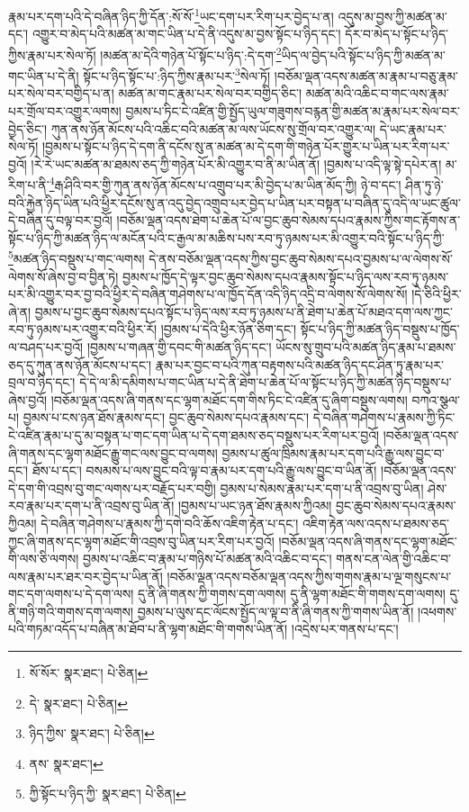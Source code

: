 རྣམ་པར་དག་པའི་དེ་བཞིན་ཉིད་ཀྱི་དོན་:སོ་སོ་\footnote{སོ་སོར་  སྣར་ཐང་།  པེ་ཅིན། }ཡང་དག་པར་རིག་པར་བྱེད་པ་ན། འདུས་མ་བྱས་ཀྱི་མཚན་མ་དང་། འགྱུར་བ་མེད་པའི་མཚན་མ་གང་ཡིན་པ་དེ་ནི་འདུས་མ་བྱས་སྟོང་པ་ཉིད་དང་། དོར་བ་མེད་པ་སྟོང་པ་ཉིད་ཀྱིས་རྣམ་པར་སེལ་ཏོ། །མཚན་མ་དེའི་གཉེན་པོ་སྟོང་པ་ཉིད་:དེ་དག་\footnote{དེ་  སྣར་ཐང་།  པེ་ཅིན། }ཡིད་ལ་བྱེད་པའི་སྟོང་པ་ཉིད་ཀྱི་མཚན་མ་གང་ཡིན་པ་དེ་ནི། སྟོང་པ་ཉིད་སྟོང་པ་:ཉིད་ཀྱིས་རྣམ་པར་\footnote{ཉིད་ཀྱིས་  སྣར་ཐང་།  པེ་ཅིན། }སེལ་ཏོ། །བཅོམ་ལྡན་འདས་མཚན་མ་རྣམ་པ་བཅུ་རྣམ་པར་སེལ་བར་བགྱིད་པ་ན། མཚན་མ་གང་རྣམ་པར་སེལ་བར་བགྱིད་ཅིང་། མཚན་མའི་འཆིང་བ་གང་ལས་རྣམ་པར་གྲོལ་བར་འགྱུར་ལགས། བྱམས་པ་ཏིང་ངེ་འཛིན་གྱི་སྤྱོད་ཡུལ་གཟུགས་བརྙན་གྱི་མཚན་མ་རྣམ་པར་སེལ་བར་བྱེད་ཅིང་། ཀུན་ནས་ཉོན་མོངས་པའི་འཆིང་བའི་མཚན་མ་ལས་ཡོངས་སུ་གྲོལ་བར་འགྱུར་ལ། དེ་ཡང་རྣམ་པར་སེལ་ཏོ། །བྱམས་པ་སྟོང་པ་ཉིད་དེ་དག་ནི་དངོས་སུ་ན་མཚན་མ་དེ་དག་གི་གཉེན་པོར་གྱུར་པ་ཡིན་པར་རིག་པར་བྱའོ། །རེ་རེ་ཡང་མཚན་མ་ཐམས་ཅད་ཀྱི་གཉེན་པོར་མི་འགྱུར་བ་ནི་མ་ཡིན་ནོ། །བྱམས་པ་འདི་ལྟ་སྟེ་དཔེར་ན། མ་རིག་པ་ནི་\footnote{ནས་  སྣར་ཐང་། }རྒ་ཤིའི་བར་གྱི་ཀུན་ནས་ཉོན་མོངས་པ་འགྲུབ་པར་མི་བྱེད་པ་མ་ཡིན་མོད་ཀྱི། ཉེ་བ་དང་། ཤིན་ཏུ་ཉེ་བའི་རྐྱེན་ཉིད་ཡིན་པའི་ཕྱིར་དངོས་སུ་ན་འདུ་བྱེད་འགྲུབ་པར་བྱེད་པ་ཡིན་པར་བསྟན་པ་བཞིན་དུ་འདི་ལ་ཡང་ཚུལ་དེ་བཞིན་དུ་བལྟ་བར་བྱའོ། །བཅོམ་ལྡན་འདས་ཐེག་པ་ཆེན་པོ་ལ་བྱང་ཆུབ་སེམས་དཔའ་རྣམས་ཀྱིས་གང་རྟོགས་ན་སྟོང་པ་ཉིད་ཀྱི་མཚན་ཉིད་ལ་མངོན་པའི་ང་རྒྱལ་མ་མཆིས་པས་རབ་ཏུ་ཉམས་པར་མི་འགྱུར་བའི་སྟོང་པ་ཉིད་ཀྱི་\footnote{ཀྱི་སྟོང་པ་ཉིད་ཀྱི་  སྣར་ཐང་།  པེ་ཅིན། }མཚན་ཉིད་བསྡུས་པ་གང་ལགས། དེ་ནས་བཅོམ་ལྡན་འདས་ཀྱིས་བྱང་ཆུབ་སེམས་དཔའ་བྱམས་པ་ལ་ལེགས་སོ་ལེགས་སོ་ཞེས་བྱ་བ་བྱིན་ཏེ། བྱམས་པ་ཁྱོད་དེ་ལྟར་བྱང་ཆུབ་སེམས་དཔའ་རྣམས་སྟོང་པ་ཉིད་ལས་རབ་ཏུ་ཉམས་པར་མི་འགྱུར་བར་བྱ་བའི་ཕྱིར་དེ་བཞིན་གཤེགས་པ་ལ་ཁྱོད་དོན་འདི་ཉིད་འདྲི་བ་ལེགས་སོ་ལེགས་སོ། །དེ་ཅིའི་ཕྱིར་ཞེ་ན། བྱམས་པ་བྱང་ཆུབ་སེམས་དཔའ་སྟོང་པ་ཉིད་ལས་རབ་ཏུ་ཉམས་པ་ནི་ཐེག་པ་ཆེན་པོ་མཐའ་དག་ལས་ཀྱང་རབ་ཏུ་ཉམས་པར་འགྱུར་བའི་ཕྱིར་རོ། །བྱམས་པ་དེའི་ཕྱིར་ཉོན་ཅིག་དང་། སྟོང་པ་ཉིད་ཀྱི་མཚན་ཉིད་བསྡུས་པ་ཁྱོད་ལ་བཤད་པར་བྱའོ། །བྱམས་པ་གཞན་གྱི་དབང་གི་མཚན་ཉིད་དང་། ཡོངས་སུ་གྲུབ་པའི་མཚན་ཉིད་རྣམ་པ་ཐམས་ཅད་དུ་ཀུན་ནས་ཉོན་མོངས་པ་དང་། རྣམ་པར་བྱང་བ་པའི་ཀུན་བརྟགས་པའི་མཚན་ཉིད་དང་ཤིན་ཏུ་རྣམ་པར་བྲལ་བ་ཉིད་དང་། དེ་དེ་ལ་མི་དམིགས་པ་གང་ཡིན་པ་དེ་ནི་ཐེག་པ་ཆེན་པོ་ལ་སྟོང་པ་ཉིད་ཀྱི་མཚན་ཉིད་བསྡུས་པ་ཞེས་བྱའོ། །བཅོམ་ལྡན་འདས་ཞི་གནས་དང་ལྷག་མཐོང་དག་གིས་ཏིང་ངེ་འཛིན་དུ་ཞིག་བསྡུས་ལགས། བཀའ་སྩལ་པ། བྱམས་པ་ངས་ཉན་ཐོས་རྣམས་དང་། བྱང་ཆུབ་སེམས་དཔའ་རྣམས་དང་། དེ་བཞིན་གཤེགས་པ་རྣམས་ཀྱི་ཏིང་ངེ་འཛིན་རྣམ་པ་དུ་མ་བསྟན་པ་གང་དག་ཡིན་པ་དེ་དག་ཐམས་ཅད་བསྡུས་པར་རིག་པར་བྱའོ། །བཅོམ་ལྡན་འདས་ཞི་གནས་དང་ལྷག་མཐོང་རྒྱུ་གང་ལས་བྱུང་བ་ལགས། བྱམས་པ་ཚུལ་ཁྲིམས་རྣམ་པར་དག་པའི་རྒྱུ་ལས་བྱུང་བ་དང་། ཐོས་པ་དང་། བསམས་པ་ལས་བྱུང་བའི་ལྟ་བ་རྣམ་པར་དག་པའི་རྒྱུ་ལས་བྱུང་བ་ཡིན་ནོ། །བཅོམ་ལྡན་འདས་དེ་དག་གི་འབྲས་བུ་གང་ལགས་པར་བརྗོད་པར་བགྱི། བྱམས་པ་སེམས་རྣམ་པར་དག་པ་ནི་འབྲས་བུ་ཡིན། ཤེས་རབ་རྣམ་པར་དག་པ་ནི་འབྲས་བུ་ཡིན་ནོ། །བྱམས་པ་ཡང་ཉན་ཐོས་རྣམས་ཀྱིའམ། བྱང་ཆུབ་སེམས་དཔའ་རྣམས་ཀྱིའམ། དེ་བཞིན་གཤེགས་པ་རྣམས་ཀྱི་དགེ་བའི་ཆོས་འཇིག་རྟེན་པ་དང་། འཇིག་རྟེན་ལས་འདས་པ་ཐམས་ཅད་ཀྱང་ཞི་གནས་དང་ལྷག་མཐོང་གི་འབྲས་བུ་ཡིན་པར་རིག་པར་བྱའོ། །བཅོམ་ལྡན་འདས་ཞི་གནས་དང་ལྷག་མཐོང་གི་ལས་ཅི་ལགས། བྱམས་པ་འཆིང་བ་རྣམ་པ་གཉིས་པོ་མཚན་མའི་འཆིང་བ་དང་། གནས་ངན་ལེན་གྱི་འཆིང་བ་ལས་རྣམ་པར་ཐར་བར་བྱེད་པ་ཡིན་ནོ། །བཅོམ་ལྡན་འདས་བཅོམ་ལྡན་འདས་ཀྱིས་གགས་རྣམ་པ་ལྔ་གསུངས་པ་གང་དག་ལགས་པ་དེ་དག་ལས། དུ་ནི་ཞི་གནས་ཀྱི་གགས་དག་ལགས། དུ་ནི་ལྷག་མཐོང་གི་གགས་དག་ལགས། དུ་ནི་གཉི་གའི་གགས་དག་ལགས། བྱམས་པ་ལུས་དང་ལོངས་སྤྱོད་ལ་ལྟ་བ་ནི་ཞི་གནས་ཀྱི་གགས་ཡིན་ནོ། །འཕགས་པའི་གཏམ་འདོད་པ་བཞིན་མ་ཐོབ་པ་ནི་ལྷག་མཐོང་གི་གགས་ཡིན་ནོ། །འདྲེས་པར་གནས་པ་དང་། 